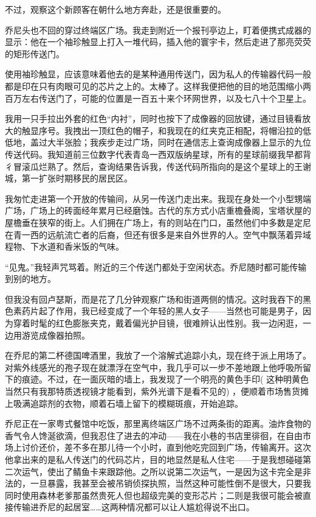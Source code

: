 \documentclass[AutoFakeBold=true]{book}
\begin{document}
不过，观察这个新顾客在朝什么地方奔赴，还是很重要的。

乔尼头也不回的穿过终端区广场。我走到附近一个报刊亭边上，盯着便携式成器的显示：他在一个袖珍触显上打入一堆代码，插入他的寰宇卡，然后走进了那亮荧荧的矩形传送门。

使用袖珍触显，应该意味着他去的是某种通用传送门，因为私人的传输器代码一般都是印在只有肉眼可见的芯片之上的。太棒了。这样我便把他的目的地范围缩小两百万左右传送门了，可能的位置是一百五十来个环网世界，以及七八十个卫星上。

我用一只手拉出外套的红色``内衬''，同时也按下了成像器的回放键，通过目镜看放大的触显序号。我拽出一顶红色的帽子，和我现在的红夹克正相配，将帽沿拉的低低地，盖过大半张脸；我疾步走过广场，同时在通信志上查询成像器上显示的九位传送代码。我知道前三位数字代表青岛一西双版纳星球，所有的星球前缀我早都背彳冒滚瓜烂熟了。然后，查询结果告诉我，传送代码所指向的是这个星球上的王谢城，第一扩张时期移民的居民区。

我匆忙走进第一个开放的传输间，从另一传送门走出来。我现在身处一个小型甥端广场，广场上的砖面经年累月已经磨蚀。古代的东方式小店重檐叠阁，宝塔状屋的屋檐垂在狭窄的街上。人们拥在广场上，有的则站在门口，虽然他们中多数是定尼在青一西的远航流亡者的后裔，但还有很多是来自外世界的人。空气中飘荡着异域程物、下水道和香米饭的气味。

``见鬼。''我轻声咒骂着。附近的三个传送门都处于空闲状态。乔尼随时都可能传输到别的地方。

但我没有回卢瑟斯，而是花了几分钟观察广场和街道两侧的情况。这时我吞下的黑色素药片起了作用，我已经变成了一个年轻的黑人女子——当然也可能是男子，因为穿着时髦的红色膨胀夹克，戴着偏光护目镜，很难辨认出性别。我一边闲逛，一边用游览成像器拍照。

在乔尼的第二杯德国啤酒里，我放了一个溶解式追踪小丸，现在终于派上用场了。对紫外线感光的孢子现在就漂浮在空气中，我几乎可以一步不差地跟上他呼吸所留下的痕迹。不过，在一面灰暗的墙上，我发现了一个明亮的黄色手印( 这种明黄色当然只有我那特质透视镜才能看到，紫外光谱下是看不见的) ，便顺着市场售货摊上吸满追踪剂的衣物，顺着石墙上留下的模糊斑痕，开始追踪。

乔尼正在一家粤式餐馆中吃饭，那里离终端区广场不过两条街的距离。油炸食物的香气令人馋涎欲滴，但我忍住了进去的冲动——我在小巷的书店里徘徊，在自由市场上讨价还价，差不多在那儿待一个小时，直到他吃完回到广场，传输离开。这次他拿出来的是私人传送门的代码芯片，目的地显然是私人住宅——于是我想碰碰第二次运气，使出了鲭鱼卡来跟踪他。之所以说第二次运气，一是因为这卡完全是非法的，一旦暴露，我甚至会被吊销侦探执照，当然这种可能性倒不是很大，只要我同时使用森林老爹那虽然贵死人但也超级完美的变形芯片；二则是我很可能会被直接传输进乔尼的起居室……这两种情况都可以让人尴尬得说不出口。
\end{document}
